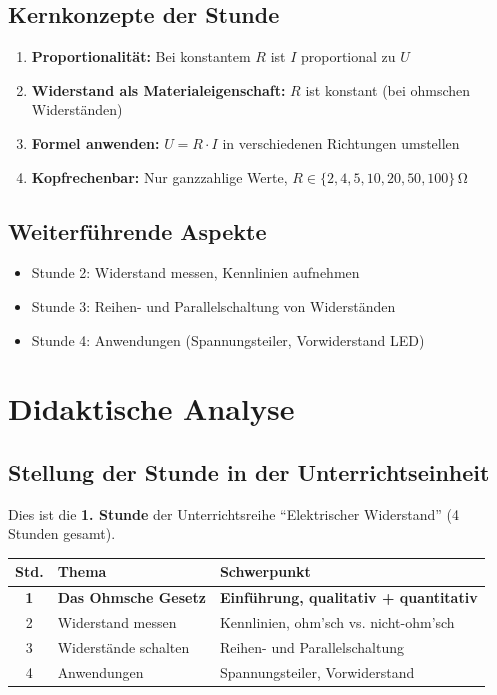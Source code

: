 \documentclass[11pt,a4paper]{article}
\begin{document}
\subsection{Kernkonzepte der Stunde}
\begin{enumerate}
    \item \textbf{Proportionalität:} Bei konstantem $R$ ist $I$ proportional zu $U$
    \item \textbf{Widerstand als Materialeigenschaft:} $R$ ist konstant (bei ohmschen Widerständen)
    \item \textbf{Formel anwenden:} $U = R \cdot I$ in verschiedenen Richtungen umstellen
    \item \textbf{Kopfrechenbar:} Nur ganzzahlige Werte, $R \in \{2, 4, 5, 10, 20, 50, 100\}\,\si{\ohm}$
\end{enumerate}

\subsection{Weiterführende Aspekte}
\begin{itemize}
    \item Stunde 2: Widerstand messen, Kennlinien aufnehmen
    \item Stunde 3: Reihen- und Parallelschaltung von Widerständen
    \item Stunde 4: Anwendungen (Spannungsteiler, Vorwiderstand LED)
\end{itemize}

\section{Didaktische Analyse}

\subsection{Stellung der Stunde in der Unterrichtseinheit}
Dies ist die \textbf{1. Stunde} der Unterrichtsreihe ``Elektrischer Widerstand'' (4 Stunden gesamt).

\begin{tabular}{|c|l|l|}
\hline
\textbf{Std.} & \textbf{Thema} & \textbf{Schwerpunkt} \\
\hline
\textbf{1} & \textbf{Das Ohmsche Gesetz} & \textbf{Einführung, qualitativ + quantitativ} \\
\hline
2 & Widerstand messen & Kennlinien, ohm'sch vs. nicht-ohm'sch \\
\hline
3 & Widerstände schalten & Reihen- und Parallelschaltung \\
\hline
4 & Anwendungen & Spannungsteiler, Vorwiderstand \\
\hline
\end{tabular}
\end{document}
